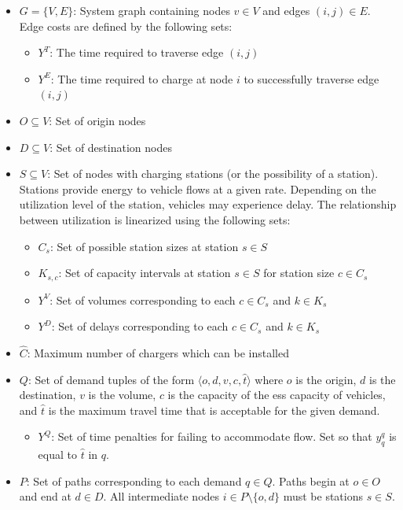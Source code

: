 \documentclass[12pt]{article}
\begin{document}
\begin{itemize}
	\item $G = \{V, E\}$: System graph containing nodes $v \in V$ and edges $(i, j) \in E$. Edge costs are defined by the following sets: \begin{itemize}
		\item $Y^T$: The time required to traverse edge $(i, j)$
		\item $Y^E$: The time required to charge at node $i$ to successfully traverse edge $(i, j)$
	\end{itemize}
	\item $O \subseteq V$: Set of origin nodes
	\item $D \subseteq V$: Set of destination nodes
	\item $S \subseteq V$: Set of nodes with charging stations (or the possibility of a station). Stations provide energy to vehicle flows at a given rate. Depending on the utilization level of the station, vehicles may experience delay. The relationship between utilization is linearized using the following sets: \begin{itemize}
		\item $C_s$: Set of possible station sizes at station $s \in S$
		\item $K_{s, c}$: Set of capacity intervals at station $s \in S$ for station size $c \in C_s$
		\item $Y^V$: Set of volumes corresponding to each $c \in C_s$ and $k \in K_s$
		\item $Y^D$: Set of delays corresponding to each $c \in C_s$ and $k \in K_s$ 
	\end{itemize}
	\item $\hat{C}$: Maximum number of chargers which can be installed
	\item $Q$: Set of demand tuples of the form $\langle o, d, v, c, \hat{t} \rangle$ where $o$ is the origin, $d$ is the destination, $v$ is the volume, $c$ is the capacity of the \gls{ess} capacity of vehicles, and $\hat{t}$ is the maximum travel time that is acceptable for the given demand. \begin{itemize}
		\item $Y^Q$: Set of time penalties for failing to accommodate flow. Set so that $y^q_q$ is equal to $\hat{t}$ in $q$.
	\end{itemize}
	\item $P$: Set of paths corresponding to each demand $q \in Q$. Paths begin at $o \in O$ and end at $d \in D$. All intermediate nodes $i \in P \setminus \{o, d\}$ must be stations $s \in S$.\begin{itemize}

\end{itemize}
\end{itemize}
\end{document}
